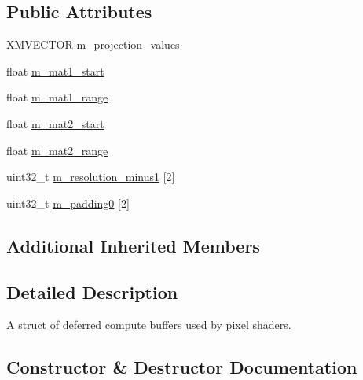 \subsection*{Public Attributes}
\begin{DoxyCompactItemize}
\item 
X\+M\+V\+E\+C\+T\+OR \hyperlink{structmage_1_1_deferred_compute_buffer_a94f0fdcbb9a0255362c2af5232a9ea55}{m\+\_\+projection\+\_\+values}
\item 
float \hyperlink{structmage_1_1_deferred_compute_buffer_a9579d7cab682b2bfe88bbf6025157a34}{m\+\_\+mat1\+\_\+start}
\item 
float \hyperlink{structmage_1_1_deferred_compute_buffer_aeafb8d5b314c709c8b5234c4c30802a3}{m\+\_\+mat1\+\_\+range}
\item 
float \hyperlink{structmage_1_1_deferred_compute_buffer_a7e3c3ecd99c36759966dee95113cf205}{m\+\_\+mat2\+\_\+start}
\item 
float \hyperlink{structmage_1_1_deferred_compute_buffer_a90029cdc2dc3360ed396ec8213b52f09}{m\+\_\+mat2\+\_\+range}
\item 
uint32\+\_\+t \hyperlink{structmage_1_1_deferred_compute_buffer_a7925ca812a2a0d2fb9a7e0daeb5fab38}{m\+\_\+resolution\+\_\+minus1} \mbox{[}2\mbox{]}
\item 
uint32\+\_\+t \hyperlink{structmage_1_1_deferred_compute_buffer_a2a93aeab5e3984c69896095698d2ec7d}{m\+\_\+padding0} \mbox{[}2\mbox{]}
\end{DoxyCompactItemize}
\subsection*{Additional Inherited Members}


\subsection{Detailed Description}
A struct of deferred compute buffers used by pixel shaders. 

\subsection{Constructor \& Destructor Documentation}
\hypertarget{structmage_1_1_deferred_compute_buffer_aaab6ca76eb31d7be6f7a9c6f549d5566}{}\label{structmage_1_1_deferred_compute_buffer_aaab6ca76eb31d7be6f7a9c6f549d5566} 
